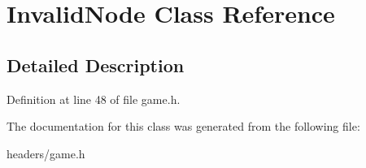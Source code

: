 \hypertarget{classInvalidNode}{\section{Invalid\+Node Class Reference}
\label{classInvalidNode}
}


\subsection{Detailed Description}


Definition at line 48 of file game.\+h.



The documentation for this class was generated from the following file\+:\begin{DoxyCompactItemize}
\item 
headers/game.\+h\end{DoxyCompactItemize}
